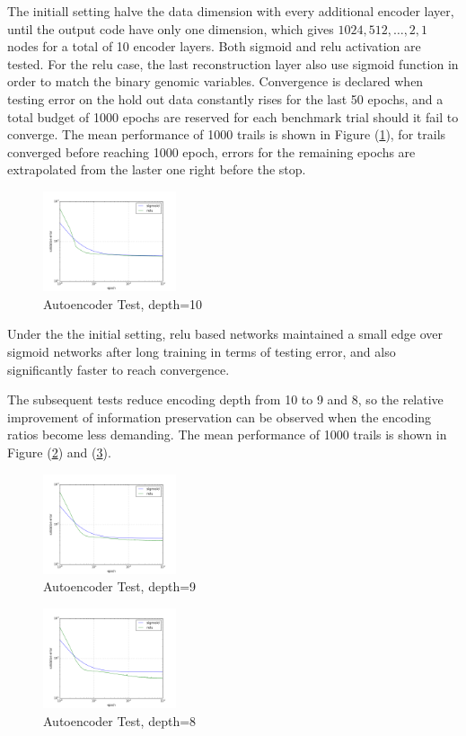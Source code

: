 \documentclass[acmtog, authorversion]{acmart}
\begin{document}
The initiall setting halve the data dimension with every additional encoder layer, until the output code have only one dimension, which gives $1024, 512, \dots, 2, 1$ nodes for a total of 10 encoder layers. Both sigmoid and relu activation are tested. For the relu case, the last reconstruction layer also use sigmoid function in order to match the binary genomic variables. Convergence is declared when testing error on the hold out data constantly rises for the last 50 epochs, and a total budget of 1000 epochs are reserved for each benchmark trial should it fail to converge. The mean performance of 1000 trails is shown in Figure (\ref{fig:ae0}), for trails converged before reaching 1000 epoch, errors for the remaining epochs are extrapolated from the laster one right before the stop.
\begin{figure}[h]
  \centering
  \includegraphics[width=0.35\textwidth]{img/00}
  \caption{Autoencoder Test, depth=10}
  \label{fig:ae0}
\end{figure}
Under the the initial setting, relu based networks maintained a small edge over sigmoid networks after long training in terms of testing error, and also significantly faster to reach convergence.

The subsequent tests reduce encoding depth from 10 to 9 and 8, so the relative improvement of information preservation can be observed when the encoding ratios become less demanding. The mean performance of 1000 trails is shown in Figure (\ref{fig:ae1}) and (\ref{fig:ae2}).
\begin{figure}[h]
  \centering
  \includegraphics[width=0.35\textwidth]{img/01}
  \caption{Autoencoder Test, depth=9}
  \label{fig:ae1}
\end{figure}
\begin{figure}[h]
  \centering
  \includegraphics[width=0.35\textwidth]{img/02}
  \caption{Autoencoder Test, depth=8}
  \label{fig:ae2}
\end{figure}
\end{document}
